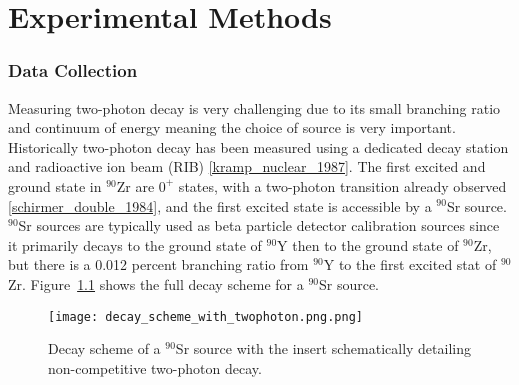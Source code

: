 \documentclass[cnatzke_thesis_proposal.tex]{subfiles}
\begin{document}
\chapter{Experimental Methods}

\subsection{Data Collection}
Measuring two-photon decay is very challenging due to its small branching ratio and continuum of energy meaning the choice of source is very important. 
Historically two-photon decay has been measured using a dedicated decay station and radioactive ion beam (RIB) \ref{kramp_nuclear_1987}. 
The first excited and ground state in $^{90}$Zr are $0^+$ states, with a two-photon transition already observed \ref{schirmer_double_1984}, and the first excited state is accessible by a $^{90}$Sr source. 
$^{90}$Sr sources are typically used as beta particle detector calibration sources since it primarily decays to the ground state of $^{90}$Y then to the ground state of $^{90}$Zr, but there is a 0.012 percent branching ratio from $^{90}$Y to the first excited stat of $^{90}$Zr. 
Figure~\ref{fig:decay_scheme_with_twophoton} shows the full decay scheme for a $^{90}$Sr source.  

\begin{figure}[H]
  \centering
  \texttt{[image: decay\_scheme\_with\_twophoton.png.png]}
  \caption{Decay scheme of a $^{90}$Sr source with the insert schematically detailing non-competitive two-photon decay.}
  \label{fig:decay_scheme_with_twophoton}
\end{figure}


\end{document}
